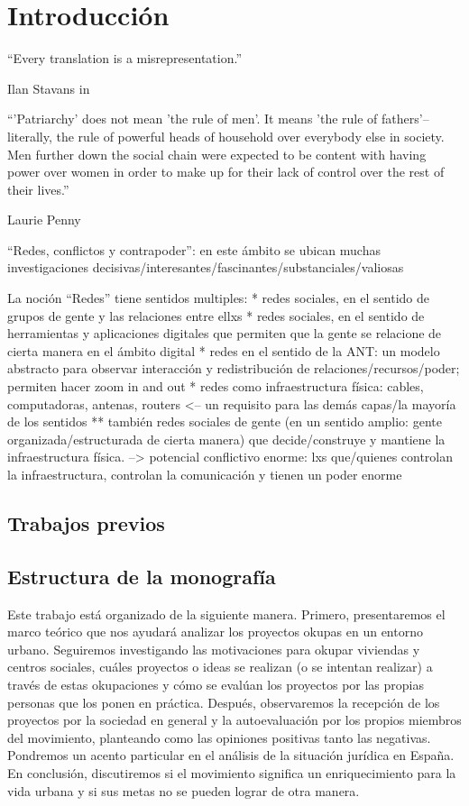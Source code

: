 \section{Introducción}

\epigraph{``Every translation is a misrepresentation.''}{Ilan Stavans in~\autocite{Albin2005}}
\epigraph{``'Patriarchy' does not mean 'the rule of men'. It means 'the rule of fathers'--literally, the rule of powerful heads of household over everybody else in society. Men further down the social chain were expected to be content with having power over women in order to make up for their lack of control over the rest of their lives.''}{Laurie Penny~\autocite[69]{Penny2014}}

``Redes, conflictos y contrapoder'': en este ámbito se ubican muchas investigaciones decisivas/interesantes/fascinantes/substanciales/valiosas

La noción ``Redes'' tiene sentidos multiples:
* redes sociales, en el sentido de grupos de gente y las relaciones entre ellxs
* redes sociales, en el sentido de herramientas y aplicaciones digitales que permiten que la gente se relacione de cierta manera en el ámbito digital
* redes en el sentido de la ANT: un modelo abstracto para observar interacción y redistribución de relaciones/recursos/poder; permiten hacer zoom in and out
* redes como infraestructura física: cables, computadoras, antenas, routers <-- un requisito para las demás capas/la mayoría de los sentidos
** también redes sociales de gente (en un sentido amplio: gente organizada/estructurada de cierta manera) que decide/construye y mantiene la infraestructura física.
--> potencial conflictivo enorme: lxs que/quienes controlan la infraestructura, controlan la comunicación y tienen un poder enorme

\subsection{Trabajos previos}


\subsection{Estructura de la monografía}

Este trabajo está organizado de la siguiente manera.
Primero, presentaremos el marco teórico que nos ayudará analizar los proyectos okupas en un entorno urbano.
Seguiremos investigando las motivaciones para okupar viviendas y centros sociales,
cuáles proyectos o ideas se realizan (o se intentan realizar) a través de estas okupaciones
y cómo se evalúan los proyectos por las propias personas que los ponen en práctica.
Después, observaremos la recepción de los proyectos por la sociedad en general y la autoevaluación por los propios miembros del movimiento, planteando como las opiniones positivas tanto las negativas.
Pondremos un acento particular en el análisis de la situación jurídica en España.
En conclusión, discutiremos si el movimiento significa un enriquecimiento para la vida urbana y si sus metas no se pueden lograr de otra manera.

